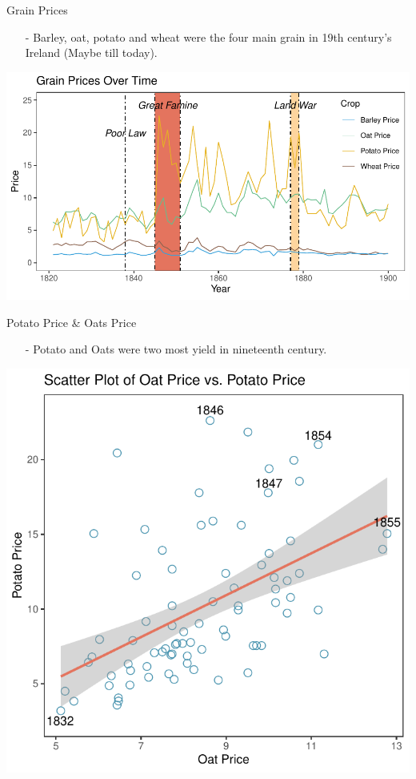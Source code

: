 \documentclass{beamer}[12pt]
\begin{document}
\begin{frame}{Grain Prices}
	\begin{itemize}
		\item[-] Barley, oat, potato and wheat were the four main grain in 19th century's Ireland (Maybe till today).
	\end{itemize}
	\begin{center}
	\includegraphics[width=1\textwidth]{grainprice.pdf}
	\end{center}
\end{frame}

\begin{frame}{Potato Price \& Oats Price}
	\begin{itemize}
		\item[-] Potato and Oats were two most yield in nineteenth century.
	\end{itemize}
	\begin{center}
	\includegraphics[width=.65\textwidth]{pricecatter.pdf}
	\end{center}
\end{frame}
\end{document}
